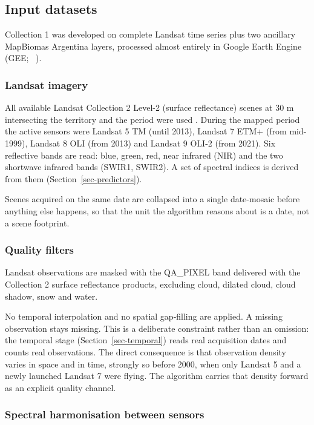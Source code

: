 \documentclass[11pt,a4paper]{article}
\begin{document}
\subsection{Input datasets}

Collection 1 was developed on complete Landsat time series plus two ancillary MapBiomas Argentina
layers, processed almost entirely in Google Earth Engine
(GEE; \citeauthor{gorelick_google_2017}~\citeyear{gorelick_google_2017}).

\subsubsection{Landsat imagery}

All available Landsat Collection 2 Level-2 (surface reflectance) scenes at 30 m intersecting the
territory and the period were used \parencite{landsatc2}. During the mapped period the active
sensors were Landsat 5 TM (until 2013), Landsat 7 ETM+ (from mid-1999), Landsat 8 OLI (from 2013)
and Landsat 9 OLI-2 (from 2021). Six reflective bands are read: blue, green, red, near infrared
(NIR) and the two shortwave infrared bands (SWIR1, SWIR2). A set of spectral indices is derived
from them (Section~\ref{sec-predictors}).

Scenes acquired on the same date are collapsed into a single date-mosaic before anything else
happens, so that the unit the algorithm reasons about is a date, not a scene footprint.

\subsubsection{Quality filters}

Landsat observations are masked with the QA\_PIXEL band delivered with the Collection 2 surface
reflectance products, excluding cloud, dilated cloud, cloud shadow, snow and water.

No temporal interpolation and no spatial gap-filling are applied. A missing observation stays
missing. This is a deliberate constraint rather than an omission: the temporal stage
(Section~\ref{sec-temporal}) reads real acquisition dates and counts real observations. 
The direct consequence is that observation density varies
in space and in time, strongly so before 2000, when only Landsat 5 and a newly launched Landsat 7
were flying. The algorithm carries that density forward as an explicit quality channel.

\subsubsection{Spectral harmonisation between sensors}
\end{document}
